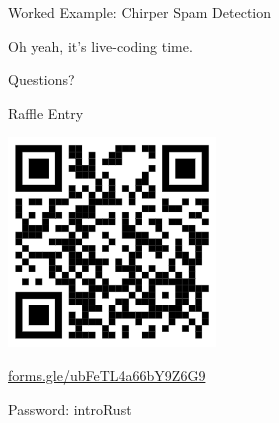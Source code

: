 \documentclass[8pt, aspectratio=169]{beamer}
\begin{document}
\begin{frame}{Worked Example: Chirper Spam Detection}
\begin{center}
Oh yeah, it's live-coding time.
\end{center}
\end{frame}

{
\begin{frame}[standout]
Questions?
\end{frame}
}

{
\begin{frame}[standout]
\begin{center}
Raffle Entry
\end{center}
\begin{multicols}{2}
\begin{center}
\includegraphics{qr.png}

\href{https://forms.gle/ubFeTL4a66bY9Z6G9}{forms.gle/ubFeTL4a66bY9Z6G9}
\end{center}
\columnbreak
\vspace*{3em}
Password: introRust
\end{multicols}
\end{frame}
}
\end{document}

